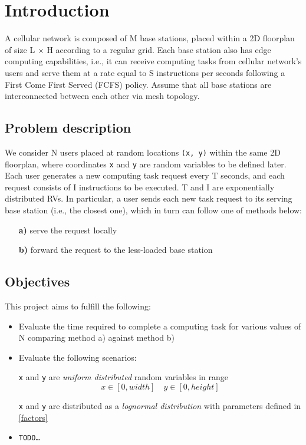 \documentclass{report}
\begin{document}
\newpage
\tableofcontents
\newpage

\setcounter{page}{1}

\chapter{Introduction}
A cellular network is composed of M base stations, placed within a 2D floorplan of size L $\times$ H
according to a regular grid. Each base station also has edge computing capabilities, i.e., it can receive
computing tasks from cellular network's users and serve them at a rate equal to S instructions per
seconds following a First Come First Served (FCFS) policy. Assume that all base stations are
interconnected between each other via mesh topology.
\section{Problem description}
We consider N users placed at random locations \texttt{(x, y)} within the same 2D floorplan, where coordinates
\texttt{x} and \texttt{y} are random variables to be defined later. Each user generates a new computing task request
every T seconds, and each request consists of I instructions to be executed. T and I are exponentially
distributed RVs. In particular, a user sends each new task request to its serving base station (i.e., the
closest one), which in turn can follow one of methods below:
\begin{itemize}
    \item [\textbf{a)}] serve the request locally
    \item [\textbf{b)}] forward the request to the less-loaded base station
\end{itemize}

\section{Objectives}
This project aims to fulfill the following:
\begin{itemize}
    \item Evaluate the time required to complete a computing task for various values of N comparing method a) against method b)
    \item Evaluate the following scenarios:
    
    \texttt{x} and \texttt{y} are \textit{uniform distributed} random variables in range \[x\in[0, width] \quad y\in[0, height]\]

    \texttt{x} and \texttt{y} are distributed as a \textit{lognormal distribution} with parameters defined in \autoref{factors}
    \item \texttt{TODO\dots}
\end{itemize}
\end{document}
